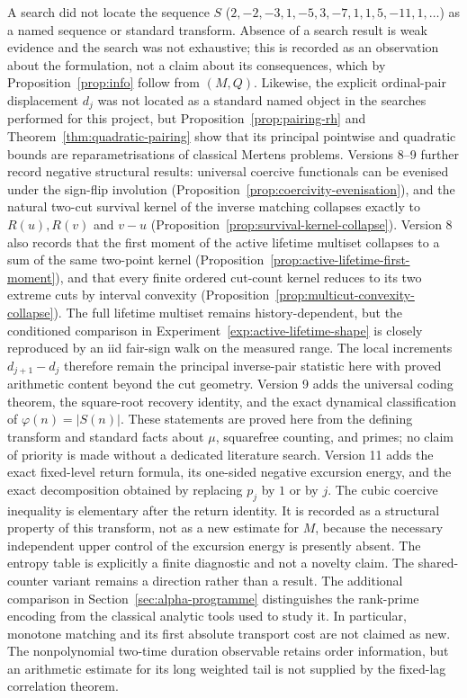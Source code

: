 \documentclass[11pt]{amsart}
\numberwithin{equation}{section}
\theoremstyle{plain}
\theoremstyle{definition}
\theoremstyle{remark}
\newcommand{\Mert}{M}
\newcommand{\Sq}{Q}
\begin{document}
A search did not locate the sequence $S$
($2,-2,-3,1,-5,3,-7,1,1,5,-11,1,\dots$) as a named sequence or standard
transform. Absence of a search result is weak evidence and the search was not
exhaustive; this is recorded as an observation about the formulation, not a
claim about its consequences, which by Proposition~\ref{prop:info} follow from
$(\Mert,\Sq)$.  Likewise, the explicit ordinal-pair displacement $d_j$ was not
located as a standard named object in the searches performed for this project,
but Proposition~\ref{prop:pairing-rh} and Theorem~\ref{thm:quadratic-pairing}
show that its principal pointwise and quadratic bounds are reparametrisations of
classical Mertens problems.  Versions 8--9 further record negative structural
results: universal coercive functionals can be evenised under the sign-flip
involution (Proposition~\ref{prop:coercivity-evenisation}), and the natural
two-cut survival kernel of the inverse matching collapses exactly to
$R(u),R(v)$ and $v-u$ (Proposition~\ref{prop:survival-kernel-collapse}).  Version
8 also records that the first moment of the active lifetime multiset collapses
to a sum of the same two-point kernel
(Proposition~\ref{prop:active-lifetime-first-moment}), and that every finite
ordered cut-count kernel reduces to its two extreme cuts by interval convexity
(Proposition~\ref{prop:multicut-convexity-collapse}).  The full lifetime
multiset remains history-dependent, but the conditioned comparison in
Experiment~\ref{exp:active-lifetime-shape} is closely reproduced by an iid
fair-sign walk on the measured range.  The local increments $d_{j+1}-d_j$
therefore remain the principal inverse-pair statistic here with proved
arithmetic content beyond the cut geometry.  Version 9 adds the universal
coding theorem, the square-root recovery identity, and the exact dynamical
classification of $\varphi(n)=|S(n)|$.  These statements are proved here from
the defining transform and standard facts about $\mu$, squarefree counting,
and primes; no claim of priority is made without a dedicated literature search.
Version 11 adds the exact fixed-level return formula, its one-sided negative
excursion energy, and the exact decomposition obtained by replacing $p_j$ by
$1$ or by $j$.  The cubic coercive inequality is elementary after the return
identity.  It is recorded as a structural property of this transform, not as a
new estimate for $M$, because the necessary independent upper control of the
excursion energy is presently absent.  The entropy table is explicitly a
finite diagnostic and not a novelty claim.
The shared-counter variant remains a direction rather than a result.
The additional comparison in Section~\ref{sec:alpha-programme} distinguishes
the rank-prime encoding from the classical analytic tools used to study it.
In particular, monotone matching and its first absolute transport cost are
not claimed as new. The nonpolynomial two-time duration observable retains
order information, but an arithmetic estimate for its long weighted tail is
not supplied by the fixed-lag correlation theorem.
\end{document}
